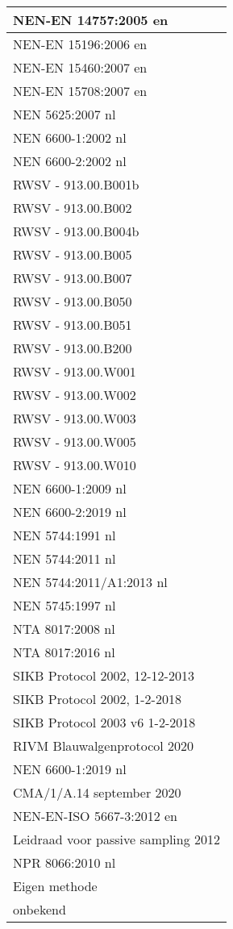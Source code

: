 \documentclass[
]{book}
\begin{document}
\begin{tabular}[t]{l}
\hline
NEN-EN 14757:2005 en\\
\hline
NEN-EN 15196:2006 en\\
\hline
NEN-EN 15460:2007 en\\
\hline
NEN-EN 15708:2007 en\\
\hline
NEN 5625:2007 nl\\
\hline
NEN 6600-1:2002 nl\\
\hline
NEN 6600-2:2002 nl\\
\hline
RWSV - 913.00.B001b\\
\hline
RWSV - 913.00.B002\\
\hline
RWSV - 913.00.B004b\\
\hline
RWSV - 913.00.B005\\
\hline
RWSV - 913.00.B007\\
\hline
RWSV - 913.00.B050\\
\hline
RWSV - 913.00.B051\\
\hline
RWSV - 913.00.B200\\
\hline
RWSV - 913.00.W001\\
\hline
RWSV - 913.00.W002\\
\hline
RWSV - 913.00.W003\\
\hline
RWSV - 913.00.W005\\
\hline
RWSV - 913.00.W010\\
\hline
NEN 6600-1:2009 nl\\
\hline
NEN 6600-2:2019 nl\\
\hline
NEN 5744:1991 nl\\
\hline
NEN 5744:2011 nl\\
\hline
NEN 5744:2011/A1:2013 nl\\
\hline
NEN 5745:1997 nl\\
\hline
NTA 8017:2008 nl\\
\hline
NTA 8017:2016 nl\\
\hline
SIKB Protocol 2002, 12-12-2013\\
\hline
SIKB Protocol 2002, 1-2-2018\\
\hline
SIKB Protocol 2003 v6 1-2-2018\\
\hline
RIVM Blauwalgenprotocol 2020\\
\hline
NEN 6600-1:2019 nl\\
\hline
CMA/1/A.14 september 2020\\
\hline
NEN-EN-ISO 5667-3:2012 en\\
\hline
Leidraad voor passive sampling 2012\\
\hline
NPR 8066:2010 nl\\
\hline
Eigen methode\\
\hline
onbekend\\
\hline
\end{tabular}
\end{document}
